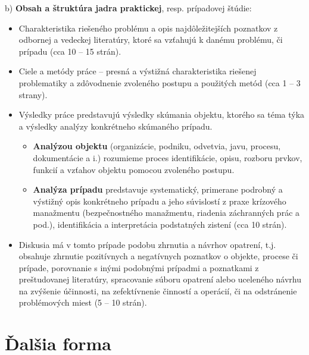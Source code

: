 b) \textbf{Obsah a štruktúra jadra praktickej}, resp. prípadovej štúdie:
\begin{itemize}
\item  Charakteristika riešeného problému a opis najdôležitejších poznatkov z odbornej a vedeckej literatúry, ktoré sa vzťahujú k danému problému, či prípadu (cca 10 – 15 strán).
\end{itemize}
\begin{itemize}
\item  Ciele a metódy práce – presná a výstižná charakteristika riešenej problematiky a zdôvodnenie zvoleného postupu a použitých metód (cca 1 – 3 strany).
\end{itemize}
\begin{itemize}
\item  Výsledky práce predstavujú výsledky skúmania objektu, ktorého sa téma týka a výsledky analýzy konkrétneho skúmaného prípadu.
\begin{itemize}
  \item \textbf{Analýzou objektu} (organizácie, podniku, odvetvia, javu, procesu, dokumentácie a i.) rozumieme proces identifikácie, opisu, rozboru prvkov, funkcií a vzťahov objektu pomocou zvoleného postupu. 
  \end{itemize}
\begin{itemize}
  \item \textbf{Analýza prípadu }predstavuje systematický, primerane podrobný a výstižný opis konkrétneho prípadu a jeho súvislostí z praxe krízového manažmentu (bezpečnostného manažmentu, riadenia záchranných prác a pod.), identifikácia a interpretácia podstatných zistení (cca 10 strán).
\end{itemize}
\end{itemize}
\begin{itemize}
\item Diskusia má v tomto prípade podobu zhrnutia a návrhov opatrení, t.j. obsahuje zhrnutie pozitívnych a negatívnych poznatkov o objekte, procese či prípade, porovnanie s inými podobnými prípadmi a poznatkami z preštudovanej literatúry, spracovanie súboru opatrení alebo uceleného návrhu na zvýšenie účinnosti, na zefektívnenie činností a operácií, či na odstránenie problémových miest (5 – 10 strán).
\end{itemize}

\section{Ďalšia forma}

